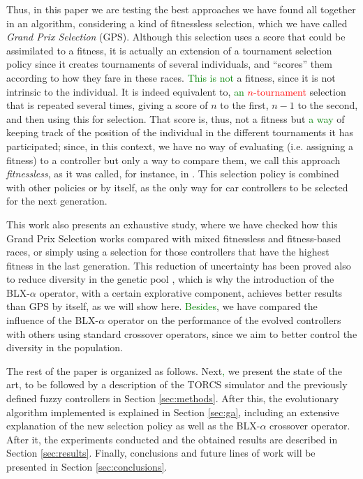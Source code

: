 \documentclass[10pt,journal,compsoc]{IEEEtran}
\begin{document}
Thus, in this paper we are testing the best approaches we have found all together in an algorithm, considering a kind of fitnessless selection, which we have called \textit{Grand Prix Selection} (GPS). Although this selection uses a score that could be assimilated to a fitness, it is actually an extension of a tournament selection policy since it creates tournaments of several individuals, and ``scores'' them according to how they fare in these races. \textcolor{green}{This is not} a fitness, since it is not intrinsic to the individual. It is indeed equivalent to, \textcolor{red}{\textcolor{green}{an} $n$-tournament} selection that is repeated several times, giving a score of $n$ to the first, $n-1$ to the second, and then using this for selection. That score is, thus, not a fitness but \textcolor{green}{ a way} of keeping track of the position of the individual in the different tournaments it has participated; since, in this context, we have no way of evaluating (i.e. assigning a fitness) to a controller but only a way to compare them, we call this approach {\em fitnessless}, as it was called, for instance, in \cite{jaskowski2008winning}.
This selection policy is combined with other policies or by itself, as the only way for car controllers to be selected for the next generation.

This work also presents an exhaustive study, where we have checked how this Grand Prix Selection works compared with mixed fitnessless and fitness-based races, or simply using a selection for those controllers that have the highest fitness in the last generation.  
This reduction of uncertainty has been proved also to reduce diversity in the genetic pool \cite{DBLP:journals/tcci/MereloLFGCCRMGTCC16}, which is why the introduction of the \mbox{BLX-$\alpha$} operator, with a certain explorative component, achieves better results than GPS by itself, as we will show here.
\textcolor{green}{Besides}, we have compared the influence of the \mbox{BLX-$\alpha$} operator on the performance of the evolved controllers with others using standard crossover operators, since we aim to better control the diversity in the population.

The rest of the paper is organized as follows. Next\textcolor{green}{,} we present the
state of the art, to be followed by a description of the TORCS
simulator and the previously defined fuzzy controllers in Section
\ref{sec:methods}. After this, the evolutionary algorithm implemented
is explained in Section \ref{sec:ga}, including an extensive explanation of the new selection policy as well as the BLX-$\alpha$ crossover operator. After it, the experiments conducted and the obtained results are described in
Section \ref{sec:results}. Finally, conclusions and future lines of
work will be presented in Section \ref{sec:conclusions}. 
\end{document}
